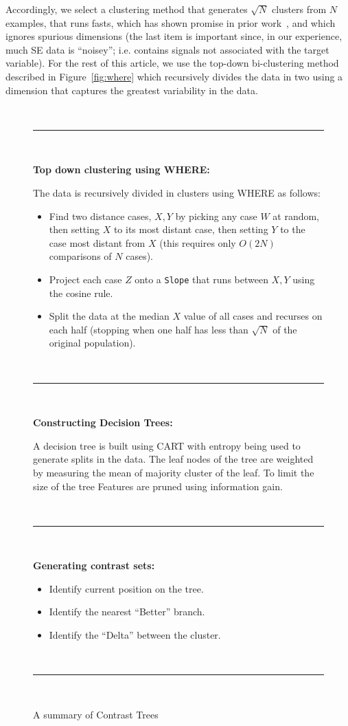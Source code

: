 \documentclass[conference]{IEEEtran}
\newcommand{\fig}[1]{Figure~\ref{fig:#1}}
\begin{document}
	Accordingly, we select a clustering method that generates $\sqrt{N}$ clusters
	from $N$ examples, that runs fasts, which has shown promise in prior work~\cite{Menzies2013}, and which ignores spurious dimensions (the last item is important since, in our experience, much SE data is ``noisey''; i.e. contains signals not associated with the target variable). For the rest of this article,
	we use  the top-down
	bi-clustering method described in \fig{where} which recursively divides the
	data in two  using a dimension that captures the greatest variability in the data. 
	\begin{figure}[t]
		\small
		~\hrule~
		
		{\bf Top down clustering using WHERE:}
		
		The data is recursively divided in clusters using WHERE as follows:
		\begin{itemize}
			
			\item Find   two   distance cases,  $X,Y$
			by picking any case $W$ at random, then setting $X$ to its most
			distant case, then setting $Y$ to the case most distant from
			$X$
			(this requires only $O(2N)$ comparisons
			of $N$ cases).
			\item Project each case $Z$
			onto a {\tt Slope} that  runs between $X,Y$ using the cosine
			rule. 
			\item Split the data at the median $X$ value of all cases and
			recurses on each half  (stopping when
			one half has less  than $\sqrt{N}$ of the original population).
		\end{itemize}
		~\hrule~
		
		{\bf Constructing Decision Trees:}
		
		A decision tree is built using CART with entropy being used to generate splits in the data. The leaf nodes of the tree are weighted by measuring the mean of majority cluster of the leaf. To limit the size of the tree Features are pruned using information gain.
		
		~\hrule~
		
		{\bf Generating contrast sets:}
		\begin{itemize}
		\item Identify current position on the tree.
		\item Identify the nearest ``Better'' branch.
		\item Identify the ``Delta'' between the cluster.		
		\end{itemize}
		~\hrule~
		\caption{A summary of Contrast Trees}
		\label{fig:contast_trees}
	\end{figure}
	
\end{document}
